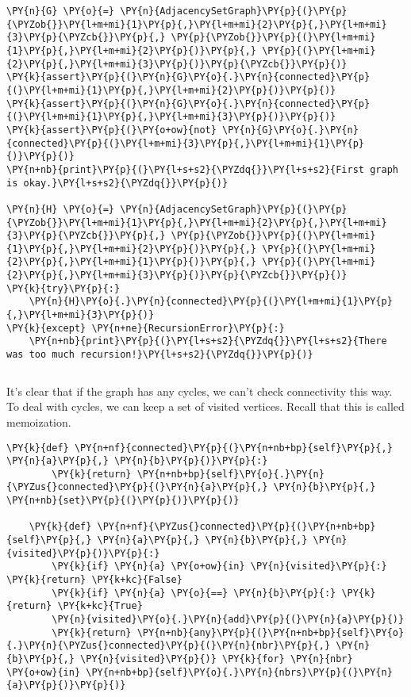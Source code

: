 \begin{Verbatim}[commandchars=\\\{\}]
\PY{n}{G} \PY{o}{=} \PY{n}{AdjacencySetGraph}\PY{p}{(}\PY{p}{\PYZob{}}\PY{l+m+mi}{1}\PY{p}{,}\PY{l+m+mi}{2}\PY{p}{,}\PY{l+m+mi}{3}\PY{p}{\PYZcb{}}\PY{p}{,} \PY{p}{\PYZob{}}\PY{p}{(}\PY{l+m+mi}{1}\PY{p}{,}\PY{l+m+mi}{2}\PY{p}{)}\PY{p}{,} \PY{p}{(}\PY{l+m+mi}{2}\PY{p}{,}\PY{l+m+mi}{3}\PY{p}{)}\PY{p}{\PYZcb{}}\PY{p}{)}
\PY{k}{assert}\PY{p}{(}\PY{n}{G}\PY{o}{.}\PY{n}{connected}\PY{p}{(}\PY{l+m+mi}{1}\PY{p}{,}\PY{l+m+mi}{2}\PY{p}{)}\PY{p}{)}
\PY{k}{assert}\PY{p}{(}\PY{n}{G}\PY{o}{.}\PY{n}{connected}\PY{p}{(}\PY{l+m+mi}{1}\PY{p}{,}\PY{l+m+mi}{3}\PY{p}{)}\PY{p}{)}
\PY{k}{assert}\PY{p}{(}\PY{o+ow}{not} \PY{n}{G}\PY{o}{.}\PY{n}{connected}\PY{p}{(}\PY{l+m+mi}{3}\PY{p}{,}\PY{l+m+mi}{1}\PY{p}{)}\PY{p}{)}
\PY{n+nb}{print}\PY{p}{(}\PY{l+s+s2}{\PYZdq{}}\PY{l+s+s2}{First graph is okay.}\PY{l+s+s2}{\PYZdq{}}\PY{p}{)}

\PY{n}{H} \PY{o}{=} \PY{n}{AdjacencySetGraph}\PY{p}{(}\PY{p}{\PYZob{}}\PY{l+m+mi}{1}\PY{p}{,}\PY{l+m+mi}{2}\PY{p}{,}\PY{l+m+mi}{3}\PY{p}{\PYZcb{}}\PY{p}{,} \PY{p}{\PYZob{}}\PY{p}{(}\PY{l+m+mi}{1}\PY{p}{,}\PY{l+m+mi}{2}\PY{p}{)}\PY{p}{,} \PY{p}{(}\PY{l+m+mi}{2}\PY{p}{,}\PY{l+m+mi}{1}\PY{p}{)}\PY{p}{,} \PY{p}{(}\PY{l+m+mi}{2}\PY{p}{,}\PY{l+m+mi}{3}\PY{p}{)}\PY{p}{\PYZcb{}}\PY{p}{)}
\PY{k}{try}\PY{p}{:}
    \PY{n}{H}\PY{o}{.}\PY{n}{connected}\PY{p}{(}\PY{l+m+mi}{1}\PY{p}{,}\PY{l+m+mi}{3}\PY{p}{)}
\PY{k}{except} \PY{n+ne}{RecursionError}\PY{p}{:}
    \PY{n+nb}{print}\PY{p}{(}\PY{l+s+s2}{\PYZdq{}}\PY{l+s+s2}{There was too much recursion!}\PY{l+s+s2}{\PYZdq{}}\PY{p}{)}
\end{Verbatim}

\begin{Verbatim}
\end{Verbatim}


It's clear that if the graph has any cycles, we can't check connectivity this way.  To deal with cycles, we can keep a set of visited vertices.  Recall that this is called memoization.

\begin{Verbatim}[commandchars=\\\{\}]
    \PY{k}{def} \PY{n+nf}{connected}\PY{p}{(}\PY{n+nb+bp}{self}\PY{p}{,} \PY{n}{a}\PY{p}{,} \PY{n}{b}\PY{p}{)}\PY{p}{:}
        \PY{k}{return} \PY{n+nb+bp}{self}\PY{o}{.}\PY{n}{\PYZus{}connected}\PY{p}{(}\PY{n}{a}\PY{p}{,} \PY{n}{b}\PY{p}{,} \PY{n+nb}{set}\PY{p}{(}\PY{p}{)}\PY{p}{)}

    \PY{k}{def} \PY{n+nf}{\PYZus{}connected}\PY{p}{(}\PY{n+nb+bp}{self}\PY{p}{,} \PY{n}{a}\PY{p}{,} \PY{n}{b}\PY{p}{,} \PY{n}{visited}\PY{p}{)}\PY{p}{:}
        \PY{k}{if} \PY{n}{a} \PY{o+ow}{in} \PY{n}{visited}\PY{p}{:} \PY{k}{return} \PY{k+kc}{False}
        \PY{k}{if} \PY{n}{a} \PY{o}{==} \PY{n}{b}\PY{p}{:} \PY{k}{return} \PY{k+kc}{True}
        \PY{n}{visited}\PY{o}{.}\PY{n}{add}\PY{p}{(}\PY{n}{a}\PY{p}{)}
        \PY{k}{return} \PY{n+nb}{any}\PY{p}{(}\PY{n+nb+bp}{self}\PY{o}{.}\PY{n}{\PYZus{}connected}\PY{p}{(}\PY{n}{nbr}\PY{p}{,} \PY{n}{b}\PY{p}{,} \PY{n}{visited}\PY{p}{)} \PY{k}{for} \PY{n}{nbr} \PY{o+ow}{in} \PY{n+nb+bp}{self}\PY{o}{.}\PY{n}{nbrs}\PY{p}{(}\PY{n}{a}\PY{p}{)}\PY{p}{)}
\end{Verbatim}



